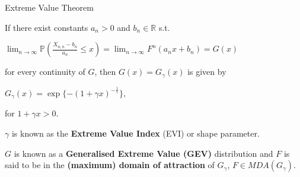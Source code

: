 \documentclass[notes]{beamer}
\begin{document}

\begin{frame}{Extreme Value Theorem}

If there exist constants $a_n >0$ and $b_n \in \mathbb{R}$ s.t. \newline

\begin{center}$\displaystyle \lim_{n \rightarrow \infty} \mathbb{P}\left(\frac{X_{n,n} - b_n}{a_n} \le x\right) =  \lim_{n \rightarrow \infty} F^n (a_n x + b_n) = G(x)$ \end{center}

for every continuity of $G$, \pause then $G(x) = G_\gamma(x)$ is given by

\begin{center} $G_\gamma(x) = \exp\{-(1+\gamma x)^{-\frac{1}{\gamma}}\}, $ \end{center}

for $1 + \gamma x >0$.

$\gamma$ is known as the \textbf{Extreme Value Index} (EVI) or shape parameter. \pause 

$G$ is known as a \textbf{Generalised Extreme Value (GEV)} distribution and $F$ is said to be in the \textbf{(maximum) domain of attraction} of $G_\gamma$, $F \in MDA(G_\gamma)$. \newline





\end{frame}
\end{document}
